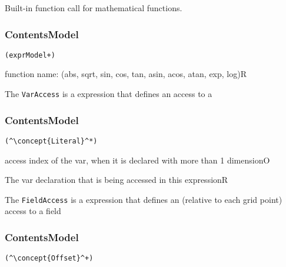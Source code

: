 Built-in function call for mathematical functions.


\subsubsection*{ContentsModel}{}
\begin{lstlisting}[style=default,frame=none]
(exprModel+)
\end{lstlisting}


\begin{HIRChildElements}
\end{HIRChildElements}

\begin{HIRAttributes}
	{function name: (abs, sqrt, sin, cos, tan, asin, acos, atan, exp, log)}{R}
\end{HIRAttributes}

The {\tt VarAccess} is a expression that defines an access to a 

\subsubsection*{ContentsModel}{}

\begin{lstlisting}[style=default,frame=none]
(^\concept{Literal}^*)
\end{lstlisting}

\begin{HIRChildElements}
	{access index of the var, when it is declared with more than 1 dimension}{O}
\end{HIRChildElements}

\begin{HIRAttributes}
	{The var declaration that is being accessed in this expression}{R}
\end{HIRAttributes}

The {\tt FieldAccess} is a expression that defines an (relative to each grid point) access to a field

\subsubsection*{ContentsModel}{}

\begin{lstlisting}[style=default,frame=none]
(^\concept{Offset}^+)
\end{lstlisting}


